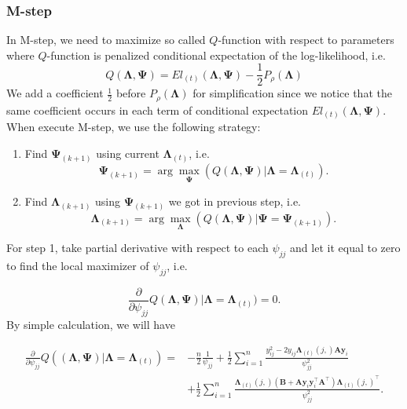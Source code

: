 \documentclass[
  a4paper,
  oneside,
  openany,
  12pt,
  onecolumn,
  twoside]{book}
\providecommand{\tightlist}{%
  \setlength{\itemsep}{0pt}\setlength{\parskip}{0pt}}\usepackage{longtable,booktabs,array}
\theoremstyle{plain}
\theoremstyle{remark}
\begin{document}
\subsubsection{M-step}\label{m-step}

In M-step, we need to maximize so called \(Q\)-function with respect to
parameters where \(Q\)-function is penalized conditional expectation of
the log-likelihood, i.e. \[
Q(\boldsymbol{\Lambda},\boldsymbol{\Psi}) = El_{(t)}(\boldsymbol{\Lambda},\boldsymbol{\Psi}) - \frac{1}{2}P_{\rho}(\boldsymbol{\Lambda})
\] We add a coefficient \(\frac{1}{2}\) before
\(P_{\rho}(\boldsymbol{\Lambda})\) for simplification since we notice
that the same coefficient occurs in each term of conditional expectation
\(El_{(t)}(\boldsymbol{\Lambda},\boldsymbol{\Psi})\). When execute
M-step, we use the following strategy\citep{Ng2012EMAlgorithm}:

\begin{enumerate}
\def\labelenumi{\arabic{enumi}.}
\tightlist
\item
  Find \(\boldsymbol{\Psi}_{(k+1)}\) using current
  \(\boldsymbol{\Lambda}_{(t)}\), i.e. \[
    \boldsymbol{\Psi}_{(k+1)} = \arg \max_{\boldsymbol{\Psi}} (Q(\boldsymbol{\Lambda},\boldsymbol{\Psi})|\boldsymbol{\Lambda}=\boldsymbol{\Lambda}_{(t)}).
  \]
\item
  Find \(\boldsymbol{\Lambda}_{(k+1)}\) using
  \(\boldsymbol{\Psi}_{(k+1)}\) we got in previous step, i.e.~ \[
    \boldsymbol{\Lambda}_{(k+1)} = \arg \max_{\boldsymbol{\Lambda}} (Q(\boldsymbol{\Lambda},\boldsymbol{\Psi})|\boldsymbol{\Psi}=\boldsymbol{\Psi}_{(k+1)}).
  \]
\end{enumerate}

For step 1, take partial derivative with respect to each \(\psi_{jj}\)
and let it equal to zero to find the local maximizer of \(\psi_{jj}\),
i.e.~

\[
\frac{\partial}{\partial \psi_{jj}}Q(\boldsymbol{\Lambda},\boldsymbol{\Psi})|\boldsymbol{\Lambda}=\boldsymbol{\Lambda}_{(t)})=0.
\] By simple calculation, we will have

\[
\begin{align*}
\frac{\partial}{\partial \psi_{jj}}Q((\boldsymbol{\Lambda},\boldsymbol{\Psi})|\boldsymbol{\Lambda}=\boldsymbol{\Lambda}_{(t)})=
&-\frac{n}{2}\frac{1}{\psi_{jj}}+\frac{1}{2}\sum_{i=1}^n
\frac{y_{ij}^2-2y_{ij}\boldsymbol{\Lambda}_{(t)}(j,)\boldsymbol{A}\boldsymbol{y}_i}{\psi_{jj}^2} \\
&+ \frac{1}{2}\sum_{i=1}^n\frac{\boldsymbol{\Lambda}_{(t)}(j,)(\boldsymbol{B}+\boldsymbol{A}\boldsymbol{y}_i\boldsymbol{y}_i^\top\boldsymbol{A}^\top)\boldsymbol{\Lambda}_{(t)}(j,)^\top}{\psi_{jj}^2}.\\
\end{align*}
\]
\end{document}
